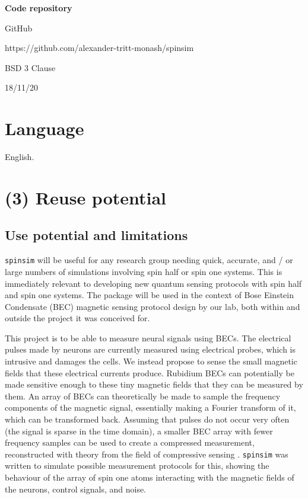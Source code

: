 \documentclass{jors}
\begin{document}
{\bf Code repository}

\begin{description}[noitemsep,topsep=0pt]
	\item[Name:] GitHub
	\item[Persistent identifier:] https://github.com/alexander-tritt-monash/spinsim
	\item[Licence:] BSD 3 Clause
	\item[Date published:] 18/11/20
\end{description}

\section*{Language}

English.

\section*{(3) Reuse potential}

	\subsection*{Use potential and limitations}
		\texttt{spinsim} will be useful for any research group needing quick, accurate, and / or large numbers of simulations involving spin half or spin one systems. This is immediately relevant to developing new quantum sensing protocols with spin half and spin one systems. The package will be used in the context of Bose Einstein Condensate (BEC) magnetic sensing protocol design by our lab, both within and outside the project it was conceived for.

		This project is to be able to measure neural signals using BECs. The electrical pulses made by neurons are currently measured using electrical probes, which is intrusive and damages the cells. We instead propose to sense the small magnetic fields that these electrical currents produce. Rubidium BECs can potentially be made sensitive enough to these tiny magnetic fields that they can be measured by them. An array of BECs can theoretically be made to sample the frequency components of the magnetic signal, essentially making a Fourier transform of it, which can be transformed back. Assuming that pulses do not occur very often (the signal is sparse in the time domain), a smaller BEC array with fewer frequency samples can be used to create a compressed measurement, reconstructed with theory from the field of compressive sensing \cite{candes_introduction_2008}. \texttt{spinsim} was written to simulate possible measurement protocols for this, showing the behaviour of the array of spin one atoms interacting with the magnetic fields of the neurons, control signals, and noise.
\end{document}
